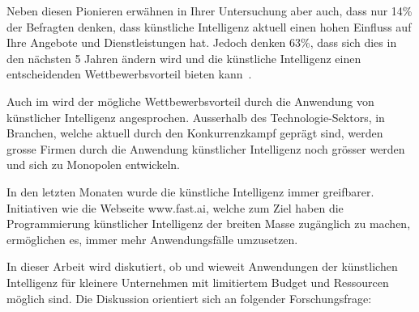 Neben diesen Pionieren erwähnen \textcite{Ransbotham2017} in Ihrer Untersuchung aber auch, dass nur 14\% der Befragten denken, dass künstliche Intelligenz aktuell einen hohen Einfluss auf Ihre Angebote und Dienstleistungen hat. Jedoch denken 63\%, dass sich dies in den nächsten 5 Jahren ändern wird und die künstliche Intelligenz einen entscheidenden Wettbewerbsvorteil bieten kann~\autocite{Ransbotham2017}.

Auch im \textcite{TheEconomist2018} wird der mögliche Wettbewerbsvorteil durch die Anwendung von künstlicher Intelligenz angesprochen. Ausserhalb des Technologie-Sektors, in Branchen, welche aktuell durch den Konkurrenzkampf geprägt sind, werden grosse Firmen durch die Anwendung künstlicher Intelligenz noch grösser werden und sich zu Monopolen entwickeln.

In den letzten Monaten wurde die künstliche Intelligenz immer greifbarer. Initiativen wie die Webseite www.fast.ai, welche zum Ziel haben die Programmierung künstlicher Intelligenz der breiten Masse zugänglich zu machen, ermöglichen es, immer mehr Anwendungsfälle umzusetzen.

In dieser Arbeit wird diskutiert, ob und wieweit Anwendungen der künstlichen Intelligenz für kleinere Unternehmen mit limitiertem Budget und Ressourcen möglich sind. Die Diskussion orientiert sich an folgender Forschungsfrage:

{
    \medskip
    \setlength{\fboxsep}{1em}
    \noindent{}
    \medskip
}





